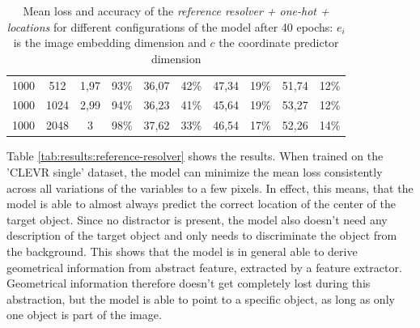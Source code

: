 \begin{table}[ht]
\begin{tabular}{cc|cc|cc|cc|cc}
        {1000} & {512}  & {1,97}                                    & {93\%}                              & {36,07}                             & {42\%}                                   & {47,34}       & {19\%}        & {51,74}       & {12\%}        \\
        {1000} & {1024} & {2,99}                                    & {94\%}                              & {36,23}                             & {41\%}                                   & {45,64}       & {19\%}        & {53,27}       & {12\%}        \\
        {1000} & {2048} & {3}                                       & {98\%}                              & {37,62}                             & {33\%}                                   & {46,54}       & {17\%}        & {52,26}       & {14\%}        \\
        \bottomrule
    \end{tabular}
    \caption{Mean loss and accuracy of the \emph{reference resolver + one-hot + locations} for different configurations of the model after 40 epochs: $e_i$ is the image embedding dimension and $c$ the coordinate predictor dimension}
    \label{tab:results:reference-resolver-one-hot-location}
\end{table}

Table \ref{tab:results:reference-resolver} shows the results.
When trained on the 'CLEVR single' dataset, the model can minimize the mean loss consistently across all variations of the variables to a few pixels.
In effect, this means, that the model is able to almost always predict the correct location of the center of the target object.
Since no distractor is present, the model also doesn't need any description of the target object and only needs to discriminate the object from the background.
This shows that the model is in general able to derive geometrical information from abstract feature, extracted by a feature extractor.
Geometrical information therefore doesn't get completely lost during this abstraction, but the model is able to point to a specific object, as long as only one object is part of the image.

